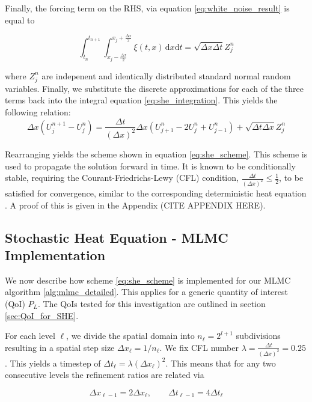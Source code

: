 Finally, the forcing term on the RHS, via equation \eqref{eq:white_noise_result} is equal to

\begin{equation*}
\int_{t_n}^{t_{n+1}} \int_{x_j-\frac{\Delta x}{2}}^{x_j+\frac{\Delta x}{2}} \xi(t,x) \,\mathrm{d}x\mathrm{d}t = \sqrt{\Delta x \Delta t} Z_j^n
\end{equation*}

where $Z_j^n$ are indepenent and identically distributed standard normal random variables.
Finally, we substitute the discrete approximations for each of the three terms back into the 
integral equation \eqref{eq:she_integration}. This yields the following relation:
\begin{equation*}
    \Delta x (U_j^{n+1} - U_j^n) = 
    \frac{\Delta t}{(\Delta x)^2} \Delta x (U_{j+1}^n - 2U_j^n + U_{j-1}^n) + 
    \sqrt{\Delta t \Delta x} Z_j^n
\end{equation*}

Rearranging yields the scheme shown in equation \eqref{eq:she_scheme}.
This scheme is used to propagate the solution forward in time. It is known to 
be conditionally stable, requiring the Courant-Friedrichs-Lewy (CFL) condition, 
$\frac{\Delta t}{(\Delta x)^2} \le \frac{1}{2}$, to be satisfied for convergence, 
similar to the corresponding deterministic heat equation \cite{suli2025nspdes}. 
A proof of this is given in the Appendix (CITE APPENDIX HERE).

\subsection{Stochastic Heat Equation - MLMC Implementation}

We now describe how scheme \eqref{eq:she_scheme} is implemented for our MLMC
algorithm \ref{alg:mlmc_detailed}. This applies for a generic quantity of interest
(QoI) $P_L$. The QoIs tested for this investigation are outlined in section 
\ref{sec:QoI_for_SHE}.

For each level $\ell$, we divide the spatial domain into $n_{\ell} = 2^{l+1}$ subdivisions
resulting in a spatial step size $\Delta x_\ell = 1 / n_\ell$. We fix CFL number $\lambda = 
\frac{\Delta t}{(\Delta x)^2} = 0.25$. This yields a timestep of 
$\Delta t_\ell = \lambda (\Delta x_\ell)^2$. This means that for any two 
consecutive levels the refinement ratios are related via

\begin{equation}\label{eq:she_discrete_relations}
    \Delta x_{\ell - 1} = 2\Delta x_\ell, \qquad \Delta t_{\ell - 1} = 4 \Delta t_\ell
\end{equation}

